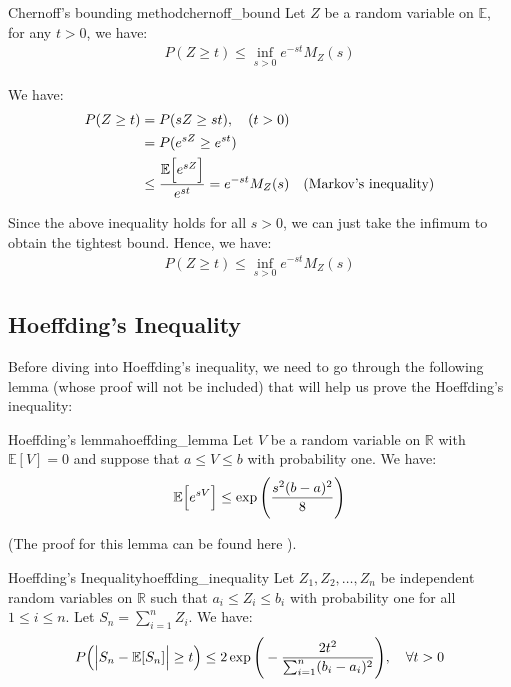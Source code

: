 \begin{corollary}{Chernoff's bounding method}{chernoff_bound}
    Let $Z$ be a random variable on $\mathbb{E}$, for any $t>0$, we have:
    \begin{align*}
        P(Z\ge t) \le \inf_{s>0} e^{-st}M_Z(s)
    \end{align*}
\end{corollary}

\begin{proof*}
    We have:
    \begin{align*}
        P(Z \ge t) &= P(sZ \ge st), \ \ \ (t > 0) \\
            &= P(e^{sZ} \ge e^{st}) \\
            &\le \frac{\mathbb{E}\Big[ e^{sZ} \Big]}{e^{st}} = e^{-st}M_Z(s) \ \ \ (\text{Markov's inequality})
    \end{align*}

    \noindent Since the above inequality holds for all $s>0$, we can just take the infimum to obtain the tightest bound. Hence, we have:
    \begin{align*}
        P(Z \ge t) \le \inf_{s>0}e^{-st}M_Z(s)
    \end{align*}
\end{proof*}

\subsection{Hoeffding's Inequality}
Before diving into Hoeffding's inequality, we need to go through the following lemma (whose proof will not be included) that will help us prove the Hoeffding's inequality:
\begin{lemma}{Hoeffding's lemma}{hoeffding_lemma}
    Let $V$ be a random variable on $\mathbb{R}$ with $\mathbb{E}[V]=0$ and suppose that $a\le V \le b$ with probability one. We have:
    \begin{align*}
        \mathbb{E}\Big[ e^{sV} \Big] \le \exp\Bigg( 
        \frac{s^2(b-a)^2}{8}
         \Bigg)
    \end{align*}
\end{lemma}
\begin{proof*}
    (The proof for this lemma can be found here \cite{wiki:hoeffding_lemma}).
\end{proof*}

\begin{theorem}{Hoeffding's Inequality}{hoeffding_inequality}
    Let $Z_1, Z_2, \dots, Z_n$ be independent random variables on $\mathbb{R}$ such that $a_i \le Z_i \le b_i$ with probability one for all $1\le i \le n$. Let $S_n = \sum_{i=1}^n Z_i$. We have:
    \begin{align*}
        P\Big(  \Big|  S_n - \mathbb{E}[S_n]  \Big| \ge t  \Big) \le 2\exp\Bigg( 
        -\frac{2t^2}{\sum_{i=1}^n (b_i-a_i)^2}
         \Bigg), \ \ \ \forall t > 0
    \end{align*}
\end{theorem}

